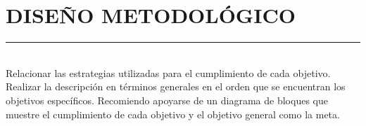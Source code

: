 \section{DISEÑO METODOLÓGICO}
\rule{\textwidth}{1pt}\\

Relacionar las estrategias utilizadas para el cumplimiento de cada objetivo. Realizar la descripción en términos generales en el orden que se encuentran los objetivos específicos. Recomiendo apoyarse de un diagrama de bloques que muestre el cumplimiento de cada objetivo y el objetivo general como la meta.
\newpage